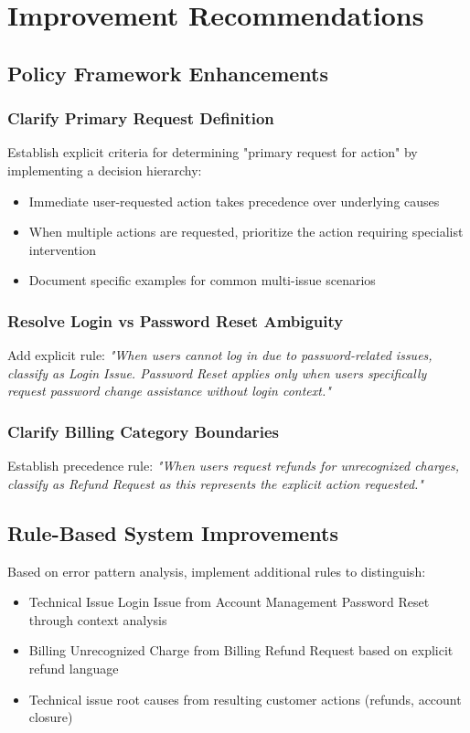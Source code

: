 \documentclass[11pt, a4paper]{article}
\begin{document}
\section{Improvement Recommendations}

\subsection{Policy Framework Enhancements}

\subsubsection{Clarify Primary Request Definition}
Establish explicit criteria for determining "primary request for action" by implementing a decision hierarchy:
\begin{itemize}
\item Immediate user-requested action takes precedence over underlying causes
\item When multiple actions are requested, prioritize the action requiring specialist intervention
\item Document specific examples for common multi-issue scenarios
\end{itemize}

\subsubsection{Resolve Login vs Password Reset Ambiguity}
Add explicit rule: \textit{"When users cannot log in due to password-related issues, classify as Login Issue. Password Reset applies only when users specifically request password change assistance without login context."}

\subsubsection{Clarify Billing Category Boundaries}
Establish precedence rule: \textit{"When users request refunds for unrecognized charges, classify as Refund Request as this represents the explicit action requested."}

\subsection{Rule-Based System Improvements}

Based on error pattern analysis, implement additional rules to distinguish:
\begin{itemize}
\item Technical Issue Login Issue from Account Management Password Reset through context analysis
\item Billing Unrecognized Charge from Billing Refund Request based on explicit refund language
\item Technical issue root causes from resulting customer actions (refunds, account closure)
\end{itemize}
\end{document}
